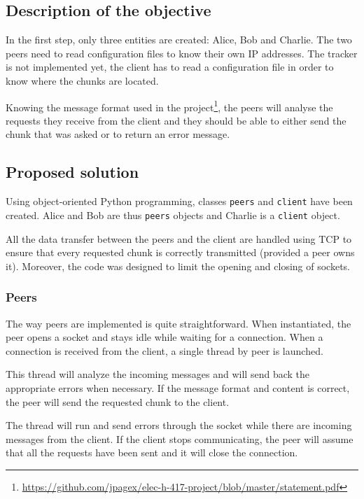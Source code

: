 \subsection{Description of the objective}

In the first step, only three entities are created: Alice, Bob and Charlie. The two peers need to read configuration files to know their own IP addresses. The tracker is not implemented yet, the client has to read a configuration file in order to know where the chunks are located.

Knowing the message format used in the project\footnote{\url{https://github.com/jpagex/elec-h-417-project/blob/master/statement.pdf}}, the peers will analyse the requests they receive from the client and they should be able to either send the chunk that was asked or to return an error message.

\subsection{Proposed solution}

Using object-oriented Python programming, classes \texttt{peers} and \texttt{client} have been created. Alice and Bob are thus \texttt{peers} objects and Charlie is a \texttt{client} object.

All the data transfer between the peers and the client are handled using TCP to ensure that every requested chunk is correctly transmitted (provided a peer owns it). Moreover, the code was designed to limit the opening and closing of sockets.

\subsubsection{Peers}

The way peers are implemented is quite straightforward. When instantiated, the peer opens a socket and stays idle while waiting for a connection. When a connection is received from the client, a single thread by peer is launched.

This thread will analyze the incoming messages and will send back the appropriate errors when necessary. If the message format and content is correct, the peer will send the requested chunk to the client.

The thread will run and send errors through the socket while there are incoming messages from the client. If the client stops communicating, the peer will assume that all the requests have been sent and it will close the connection.

